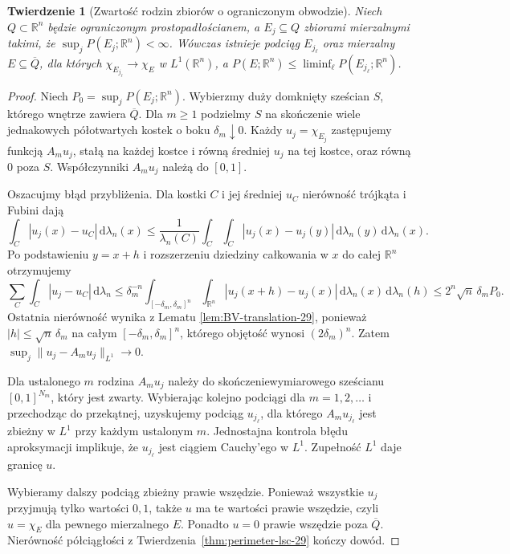 \documentclass[11pt,a4paper,oneside]{book}
\numberwithin{equation}{chapter}
\theoremstyle{plain}
\newtheorem{twierdzenie}{Twierdzenie}[chapter]
\theoremstyle{definition}
\theoremstyle{remark}
\begin{document}
\begin{twierdzenie}[Zwartość rodzin zbiorów o ograniczonym obwodzie]
\label{thm:perimeter-compact-29}
Niech $Q\subset\mathbb R^n$ będzie ograniczonym
prostopadłościanem, a $E_j\subseteq Q$ zbiorami
mierzalnymi takimi, że
$\sup_j P(E_j;\mathbb R^n)<\infty$.
Wówczas istnieje podciąg $E_{j_\ell}$ oraz
mierzalny $E\subseteq\overline Q$, dla których
$\chi_{E_{j_\ell}}\to\chi_E$ w $L^1(\mathbb R^n)$,
a $P(E;\mathbb R^n)\le\liminf_\ell P(E_{j_\ell};\mathbb R^n)$.
\end{twierdzenie}
\begin{proof}
Niech $P_0=\sup_jP(E_j;\mathbb R^n)$.
Wybierzmy duży domknięty sześcian $S$, którego wnętrze
zawiera $\overline Q$. Dla $m\ge1$ podzielmy $S$
na skończenie wiele jednakowych półotwartych
kostek o boku $\delta_m\downarrow0$.
Każdy $u_j=\chi_{E_j}$ zastępujemy funkcją
$A_m u_j$, stałą na każdej kostce i równą
średniej $u_j$ na tej kostce, oraz równą $0$ poza $S$.
Współczynniki $A_m u_j$ należą do $[0,1]$.

Oszacujmy błąd przybliżenia. Dla kostki $C$
i jej średniej $u_C$ nierówność trójkąta i Fubini dają
\[
 \int_C|u_j(x)-u_C|\,\mathrm d\lambda_n(x)
 \le\frac1{\lambda_n(C)}\int_C\int_C
 |u_j(x)-u_j(y)|\,\mathrm d\lambda_n(y)
 \,\mathrm d\lambda_n(x).
\]
Po podstawieniu $y=x+h$ i rozszerzeniu dziedziny
całkowania w $x$ do całej $\mathbb R^n$ otrzymujemy
\[
 \sum_C\int_C|u_j-u_C|\,\mathrm d\lambda_n
 \le\delta_m^{-n}\int_{[-\delta_m,\delta_m]^n}
 \int_{\mathbb R^n}|u_j(x+h)-u_j(x)|
 \,\mathrm d\lambda_n(x)\,\mathrm d\lambda_n(h)
 \le 2^n\sqrt n\,\delta_m P_0.
\]
Ostatnia nierówność wynika z Lematu
\ref{lem:BV-translation-29}, ponieważ $|h|\le\sqrt n\,\delta_m$
na całym $[-\delta_m,\delta_m]^n$, którego objętość
wynosi $(2\delta_m)^n$. Zatem
$\sup_j\|u_j-A_mu_j\|_{L^1}\to0$.

Dla ustalonego $m$ rodzina $A_m u_j$ należy do
skończeniewymiarowego sześcianu $[0,1]^{N_m}$,
który jest zwarty. Wybierając kolejno podciągi dla
$m=1,2,\ldots$ i przechodząc do przekątnej,
uzyskujemy podciąg $u_{j_\ell}$, dla którego
$A_m u_{j_\ell}$ jest zbieżny w $L^1$
przy każdym ustalonym $m$. Jednostajna kontrola
błędu aproksymacji implikuje, że $u_{j_\ell}$
jest ciągiem Cauchy'ego w $L^1$. Zupełność
$L^1$ daje granicę $u$.

Wybieramy dalszy podciąg zbieżny prawie wszędzie.
Ponieważ wszystkie $u_j$ przyjmują tylko wartości
$0,1$, także $u$ ma te wartości prawie wszędzie,
czyli $u=\chi_E$ dla pewnego mierzalnego $E$.
Ponadto $u=0$ prawie wszędzie poza $\overline Q$.
Nierówność półciągłości z
Twierdzenia~\ref{thm:perimeter-lsc-29} kończy dowód.
\end{proof}
\end{document}
